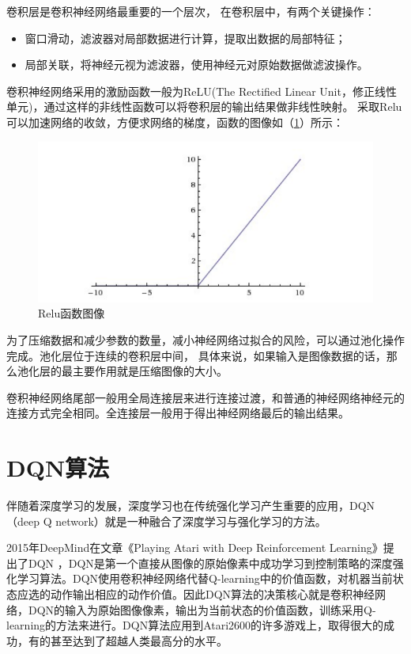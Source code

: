卷积层是卷积神经网络最重要的一个层次，
在卷积层中，有两个关键操作：
\begin{itemize}
  \item 窗口滑动，滤波器对局部数据进行计算，提取出数据的局部特征；
  \item 局部关联，将神经元视为滤波器，使用神经元对原始数据做滤波操作。 
\end{itemize}

卷积神经网络采用的激励函数一般为ReLU(The Rectified Linear Unit，修正线性单元)，通过这样的非线性函数可以将卷积层的输出结果做非线性映射。
采取Relu可以加速网络的收敛，方便求网络的梯度，函数的图像如（\ref{fig:Relu}）所示：
\begin{figure}[h]
  \centering
  \includegraphics[scale=0.5]{static/Relu.png}
  \caption{Relu函数图像}
  \label{fig:Relu}
\end{figure}

为了压缩数据和减少参数的数量，减小神经网络过拟合的风险，可以通过池化操作完成。池化层位于连续的卷积层中间，
具体来说，如果输入是图像数据的话，那么池化层的最主要作用就是压缩图像的大小。

卷积神经网络尾部一般用全局连接层来进行连接过渡，和普通的神经网络神经元的连接方式完全相同。全连接层一般用于得出神经网络最后的输出结果。
\section{DQN算法}
伴随着深度学习的发展，深度学习也在传统强化学习产生重要的应用，DQN（deep Q network）就是一种融合了深度学习与强化学习的方法。

2015年DeepMind在文章《Playing Atari with Deep Reinforcement Learning》\cite{mnih2013playing}提出了DQN ，DQN是第一个直接从图像的原始像素中成功学习到控制策略的深度强化学习算法。DQN使用卷积神经网络代替Q-learning中的价值函数，对机器当前状态应选的动作输出相应的动作价值。因此DQN算法的决策核心就是卷积神经网络，DQN的输入为原始图像像素，输出为当前状态的价值函数，训练采用Q-learning的方法来进行。DQN算法应用到Atari2600的许多游戏上，取得很大的成功，有的甚至达到了超越人类最高分的水平。

